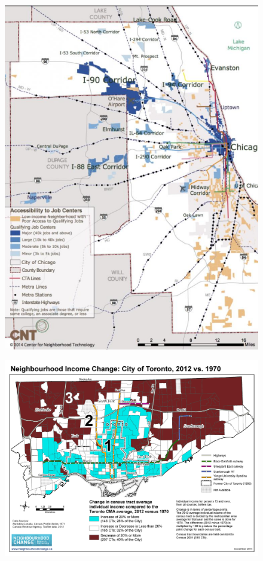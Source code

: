 \documentclass[aspectratio=169]{beamer}
\begin{document}
\begin{frame}
	
	\begin{figure}
		\centering
		\includegraphics[width=0.84\linewidth]{images/chicago_spatial_mismatch.png}
	\end{figure}
	
\end{frame}




\begin{frame}
	
	\begin{figure}
		\centering
		\includegraphics[width=0.84\linewidth]{images/3cities_2012_1970.jpeg}
	\end{figure}
	
\end{frame}
\end{document}
